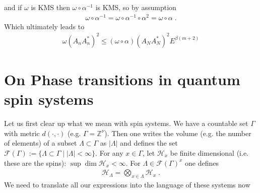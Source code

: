 \documentclass[
a4paper, %
11pt, %
onecolumn, %
openany, %
]{memoir}
\theoremstyle{definition}
\theoremstyle{remark}
\theoremstyle{plain}
\begin{document}
and if $\omega$ is KMS then $\omega\circ\alpha^{-1}$ is KMS, so by assumption \begin{align}
\omega\circ\alpha^{-1}=\omega\circ\alpha^{-1}\circ\alpha^2=\omega\circ\alpha\; .
\end{align}
Which ultimately leads to \begin{align}
\omega(A_nA_n^*)^2\leq (\omega\circ\alpha)(A_NA_N^*)^2E^{\beta(m+2)}
\end{align}
\chapter{On Phase transitions in quantum spin systems}
Let us first clear up what we mean with spin systems. We have a countable set $\Gamma$ with metric $d(\cdot,\cdot)$ (e.g. $\Gamma=\mathbb{Z}^{\nu}$). Then one writes the volume (e.g. the number of elements) of a subset $\Lambda\subset\Gamma$ as $|\Lambda|$ and defines the set $\mathcal{F}(\Gamma):=\{\Lambda\subset\Gamma\mid |\Lambda|<\infty\}$. For any $x\in\Gamma$, let $\mathcal{H}_x$ be finite dimensional (i.e. these are the spins): $\sup\dim\mathcal{H}_x<\infty$. For $\Lambda\in\mathcal{F}(\Gamma)^x$ one defines \begin{align}
\mathcal{H}_{\Lambda}=\bigotimes_{x\in\Lambda}\mathcal{H}_x\; .
\end{align}
We need to translate all our expressions into the language of these systems now
\end{document}
